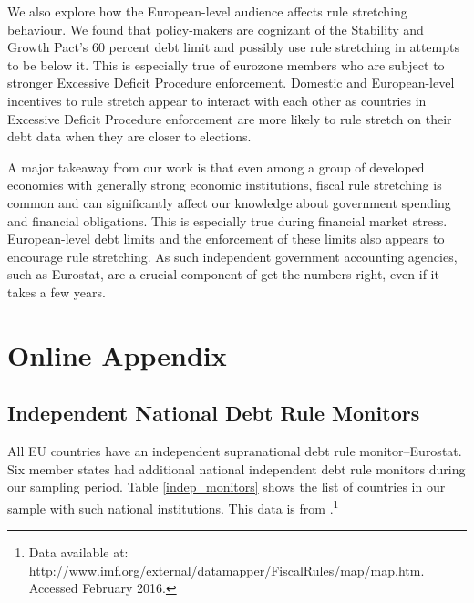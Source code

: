 \documentclass[]{article}
\begin{document}
We also explore how the European-level audience affects rule stretching behaviour. We found that policy-makers are cognizant of the Stability and Growth Pact's 60 percent debt limit and possibly use rule stretching in attempts to be below it. This is especially true of eurozone members who are subject to stronger Excessive Deficit Procedure enforcement. Domestic and European-level incentives to rule stretch appear to interact with each other as countries in Excessive Deficit Procedure enforcement are more likely to rule stretch on their debt data when they are closer to elections.

A major takeaway from our work is that even among a group of developed economies with generally strong economic institutions, fiscal rule stretching is common and can significantly affect our knowledge about government spending and financial obligations. This is especially true during financial market stress. European-level debt limits and the enforcement of these limits also appears to encourage rule stretching. As such independent government accounting agencies, such as Eurostat, are a crucial component of get the numbers right, even if it takes a few years.


\clearpage




\pagebreak
\renewcommand{\thepage}{A-\arabic{page}}\setcounter{page}{1}
\renewcommand{\thesection}{Appendix \arabic{section}}\setcounter{section}{0}
\renewcommand{\thetable}{A-\arabic{table}}\setcounter{table}{0}
\renewcommand{\thefigure}{A-\arabic{figure}}\setcounter{figure}{0}
\clearpage

\section*{Online Appendix}

\subsection*{Independent National Debt Rule Monitors}

All EU countries have an independent supranational debt rule monitor--Eurostat. Six member states had additional national independent debt rule monitors during our sampling period. Table \ref{indep_monitors} shows the list of countries in our sample with such national institutions. This data is from \cite{bova2015rules}.\footnote{Data available at: \url{http://www.imf.org/external/datamapper/FiscalRules/map/map.htm}. Accessed February 2016.}
\end{document}
